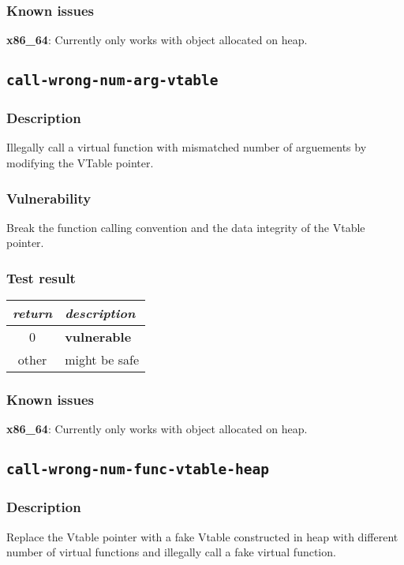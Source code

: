 \documentclass[a4paper]{book}
\begin{document}
\subsubsection{Known issues}

\textbf{x86\_64}: Currently only works with object allocated on heap.


\newpage
\subsection{\texttt{call-wrong-num-arg-vtable}}\label{test-call-wrong-num-arg-vtable}

\subsubsection{Description}
Illegally call a virtual function with mismatched number of arguements by modifying the VTable pointer.

\subsubsection{Vulnerability}
Break the function calling convention and the data integrity of the Vtable pointer.

\subsubsection{Test result}
\begin{tabular}{cl}
  \toprule
  \emph{return}  & \emph{description} \\
  \midrule
  0              & \textbf{vulnerable} \\
  other          & might be safe \\
  \bottomrule
\end{tabular}

\subsubsection{Known issues}

\textbf{x86\_64}: Currently only works with object allocated on heap.


\newpage
\subsection{\texttt{call-wrong-num-func-vtable-heap}}\label{test-call-wrong-num-func-vtable-heap}

\subsubsection{Description}
Replace the Vtable pointer with a fake Vtable constructed in heap with different number of virtual functions and
illegally call a fake virtual function.
\end{document}

